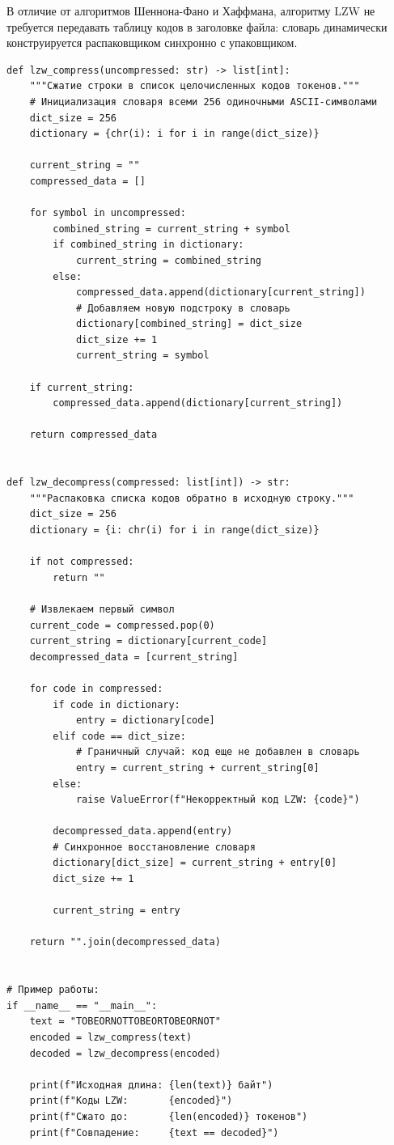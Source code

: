 \documentclass[11pt,a4paper]{article}
\begin{document}
В отличие от алгоритмов Шеннона-Фано и Хаффмана, алгоритму LZW не требуется передавать таблицу кодов в заголовке файла: словарь динамически конструируется распаковщиком синхронно с упаковщиком.

\begin{verbatim}
def lzw_compress(uncompressed: str) -> list[int]:
    """Сжатие строки в список целочисленных кодов токенов."""
    # Инициализация словаря всеми 256 одиночными ASCII-символами
    dict_size = 256
    dictionary = {chr(i): i for i in range(dict_size)}

    current_string = ""
    compressed_data = []

    for symbol in uncompressed:
        combined_string = current_string + symbol
        if combined_string in dictionary:
            current_string = combined_string
        else:
            compressed_data.append(dictionary[current_string])
            # Добавляем новую подстроку в словарь
            dictionary[combined_string] = dict_size
            dict_size += 1
            current_string = symbol

    if current_string:
        compressed_data.append(dictionary[current_string])

    return compressed_data


def lzw_decompress(compressed: list[int]) -> str:
    """Распаковка списка кодов обратно в исходную строку."""
    dict_size = 256
    dictionary = {i: chr(i) for i in range(dict_size)}

    if not compressed:
        return ""

    # Извлекаем первый символ
    current_code = compressed.pop(0)
    current_string = dictionary[current_code]
    decompressed_data = [current_string]

    for code in compressed:
        if code in dictionary:
            entry = dictionary[code]
        elif code == dict_size:
            # Граничный случай: код еще не добавлен в словарь
            entry = current_string + current_string[0]
        else:
            raise ValueError(f"Некорректный код LZW: {code}")

        decompressed_data.append(entry)
        # Синхронное восстановление словаря
        dictionary[dict_size] = current_string + entry[0]
        dict_size += 1

        current_string = entry

    return "".join(decompressed_data)


# Пример работы:
if __name__ == "__main__":
    text = "TOBEORNOTTOBEORTOBEORNOT"
    encoded = lzw_compress(text)
    decoded = lzw_decompress(encoded)

    print(f"Исходная длина: {len(text)} байт")
    print(f"Коды LZW:       {encoded}")
    print(f"Сжато до:       {len(encoded)} токенов")
    print(f"Совпадение:     {text == decoded}")
\end{verbatim}
\end{document}
